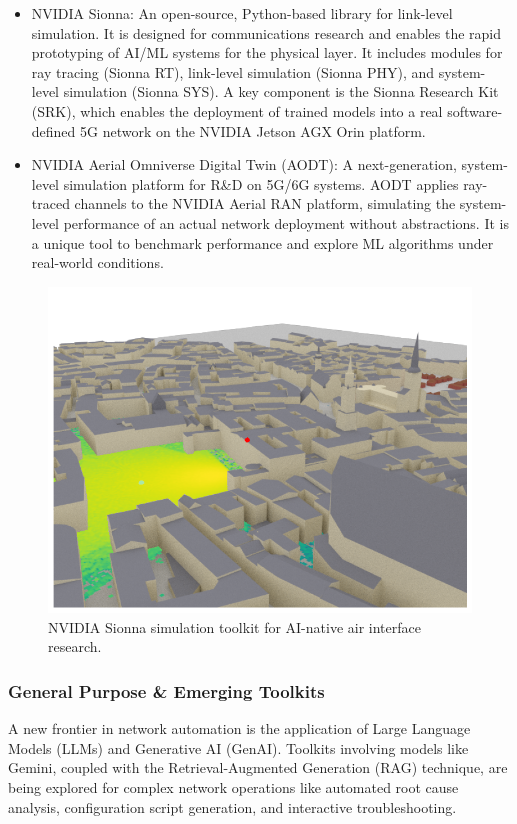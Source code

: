 \documentclass[conference]{IEEEtran}
\begin{document}
\begin{itemize}
\item NVIDIA Sionna: An open-source, Python-based library for link-level simulation. It is designed for communications research and enables the rapid prototyping of AI/ML systems for the physical layer. It includes modules for ray tracing (Sionna RT), link-level simulation (Sionna PHY), and system-level simulation (Sionna SYS). A key component is the Sionna Research Kit (SRK), which enables the deployment of trained models into a real software-defined 5G network on the NVIDIA Jetson AGX Orin platform.

\item NVIDIA Aerial Omniverse Digital Twin (AODT): A next-generation, system-level simulation platform for R\&D on 5G/6G systems. AODT applies ray-traced channels to the NVIDIA Aerial RAN platform, simulating the system-level performance of an actual network deployment without abstractions. It is a unique tool to benchmark performance and explore ML algorithms under real-world conditions.
\end{itemize}

\begin{figure}[htbp]
\centerline{\includegraphics[width=0.9\columnwidth]{images/nvidia_sionna_simulation.png}}
\caption{NVIDIA Sionna simulation toolkit for AI-native air interface research.}
\label{fig:nvidia_sionna_simulation}
\end{figure}

\subsubsection{General Purpose \& Emerging Toolkits}
A new frontier in network automation is the application of Large Language Models (LLMs) and Generative AI (GenAI). Toolkits involving models like Gemini, coupled with the Retrieval-Augmented Generation (RAG) technique, are being explored for complex network operations like automated root cause analysis, configuration script generation, and interactive troubleshooting.
\end{document}
